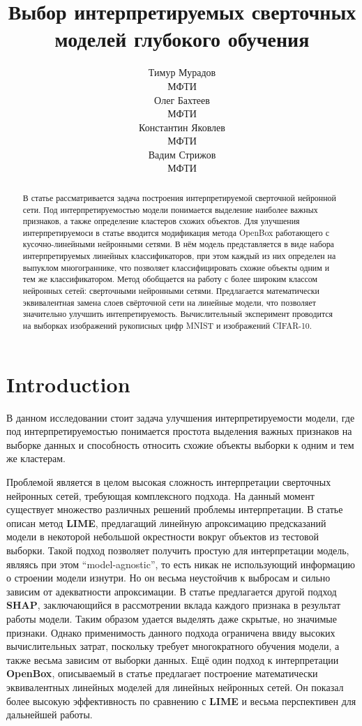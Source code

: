 \documentclass[12pt]{article}
\title{Выбор интерпретируемых сверточных моделей глубокого обучения}
\author{ Тимур Мурадов\\
	МФТИ\\
	\And
	Олег Бахтеев \\
	МФТИ\\
	\And
	Константин Яковлев \\
	МФТИ\\
	\And
	Вадим Стрижов \\
	МФТИ\\
}
\date{}
\begin{document}
\maketitle

\begin{abstract}
	В статье рассматривается задача построения интерпретируемой сверточной нейронной сети. Под интерпретируемостью модели понимается выделение наиболее важных признаков, а также определение кластеров схожих объектов. Для улучшения интерпретируемоси в статье вводится модификация метода OpenBox работающего с  кусочно-линейными нейронными сетями. В нём модель представляется в виде набора интерпретируемых линейных классификаторов, при этом каждый из них определен на выпуклом многограннике, что позволяет классифицировать схожие объекты одним и тем же классификатором. Метод обобщается на работу с более широким классом нейронных сетей: сверточными нейронными сетями. Предлагается математически эквивалентная замена слоев свёрточной сети на линейные модели, что позволяет значительно улучшить интепретируемость. Вычислительный эксперимент проводится на выборках изображений рукописных цифр MNIST и изображений CIFAR-10.
\end{abstract}



\section{Introduction}
В данном исследовании стоит задача улучшения интерпретируемости модели, где под интерпретируемостью понимается простота выделения важных признаков на выборке данных и способность относить схожие объекты выборки к одним и тем же кластерам.

Проблемой является в целом высокая сложность интерпретации сверточных нейронных сетей, требующая комплексного подхода. На данный момент существует множество различных решений проблемы интерпретации. В статье \cite{ribeiro2016why} описан метод \textbf{LIME}, предлагащий линейную апроксимацию предсказаний модели в некоторой небольшой окрестности вокруг объектов из тестовой выборки. Такой подход позволяет получить простую для интерпретации модель, являясь при этом \textquotedblleft model-agnostic\textquotedblright, то есть никак не использующий информацию о строении модели изнутри. Но он весьма неустойчив к выбросам и сильно зависим от адекватности апроксимации. В статье \cite{Lundberg2017aunified} предлагается другой подход \textbf{SHAP}, заключающийся в рассмотрении вклада каждого признака в результат работы модели. Таким образом удается выделять даже скрытые, но значимые признаки. Однако применимость данного подхода ограничена ввиду высоких вычислительных затрат, поскольку требует многократного обучения модели, а также весьма зависим от выборки данных. Ещё один подход к интерпретации \textbf{OpenBox}, описываемый в статье \cite{chu2019exact} предлагает построение математически эквивалентных линейных моделей для линейных нейронных сетей. Он показал более высокую эффективность по сравнению с \textbf{LIME} и весьма перспективен для дальнейшей работы.
\end{document}
